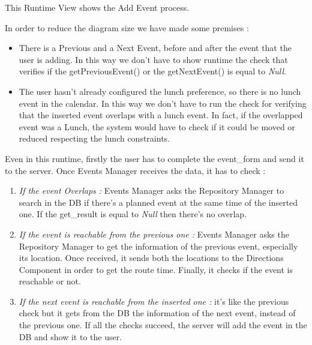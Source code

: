 \newpage
{}
This Runtime View shows the Add Event process.\par
In order to reduce the diagram size we have made some premises :
\begin{itemize}
	\setlength{\leftskip}{1cm}
	\item There is a Previous and a Next Event, before and after the event that the user is adding. In this way we don’t have to show runtime the check that verifies if the getPreviousEvent() or the getNextEvent() is equal to \emph{Null}.
	\item The user hasn’t already configured the lunch preference, so there is no lunch event in the calendar. In this way we don’t have to run the check for verifying that the inserted event overlaps with a lunch event. In fact, if the overlapped event was a Lunch, the system would have to check if it could be moved or reduced respecting the lunch constraints.
\end{itemize}\par
Even in this runtime, firstly the user has to complete the event\_form and send it to the server.
Once Events Manager receives the data, it has to check :
\begin{enumerate}
	\setlength{\leftskip}{1cm}
	\item \emph{If the event Overlaps :} Events Manager asks the Repository Manager to search in the DB if there’s a planned event at the same time of the inserted one. If the get\_result is equal to \emph{Null} then there’s no overlap.
	\item \emph{If the event is reachable from the previous one :} Events Manager asks the Repository Manager to get the information of the previous event, especially its location. Once received, it sends both the locations to the Directions Component in order to get the route time. Finally, it checks if the event is reachable or not.
	\item \emph{If the next event is reachable from the inserted one :} it’s like the previous check but it gets from the DB the information of the next event, instead of the previous one.
	If all the checks succeed, the server will add the event in the DB and show it to the user.
\end{enumerate}
